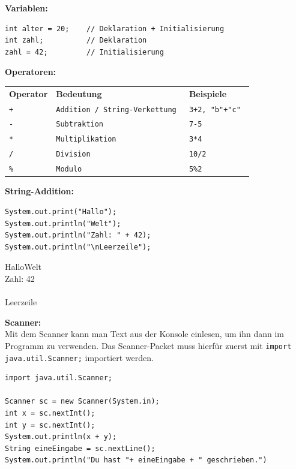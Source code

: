 \documentclass{../../sheet}
\begin{document}
\textbf{Variablen:}
\begin{center}
	\begin{verbatim}
int alter = 20;    // Deklaration + Initialisierung
int zahl;          // Deklaration
zahl = 42;         // Initialisierung
  \end{verbatim}
\end{center}
\bigskip
\textbf{Operatoren:}
\begin{center}
	\begin{tabular}{l l l}
		\rowcolor{tablehead}
		\textbf{Operator
		}           & \textbf{Bedeutung
		}           & \textbf{Beispiele
		}                                                  \\
		\texttt{+}  & \texttt{Addition / String-Verkettung
		}           & \texttt{3+2, "b"+"c"
		}                                                  \\
		\texttt{-}  & \texttt{Subtraktion
		}           & \texttt{7-5
		}                                                  \\
		\texttt{*}  & \texttt{Multiplikation
		}           & \texttt{3*4
		}                                                  \\
		\texttt{/}  & \texttt{Division
		}           & \texttt{10/2
		}                                                  \\
		\texttt{\%} & \texttt{Modulo
		}           & \texttt{5\%2
		}                                                  \\
	\end{tabular}
\end{center}
\bigskip
\textbf{String-Addition:}
\begin{verbatim}
System.out.print("Hallo");
System.out.println("Welt");
System.out.println("Zahl: " + 42);
System.out.println("\nLeerzeile");
  \end{verbatim}
\begin{ausgabe}
	HalloWelt\\
	Zahl: 42\\\\
	Leerzeile
\end{ausgabe}
\bigskip
\textbf{Scanner:}\\
Mit dem Scanner kann man Text aus der Konsole einlesen, um ihn dann im Programm zu verwenden. Das Scanner-Packet muss hierfür zuerst mit \texttt{import java.util.Scanner;} importiert werden.
\begin{verbatim}
import java.util.Scanner;

Scanner sc = new Scanner(System.in);
int x = sc.nextInt();
int y = sc.nextInt();
System.out.println(x + y);
String eineEingabe = sc.nextLine();
System.out.println("Du hast "+ eineEingabe + " geschrieben.")
  \end{verbatim}
\end{document}
